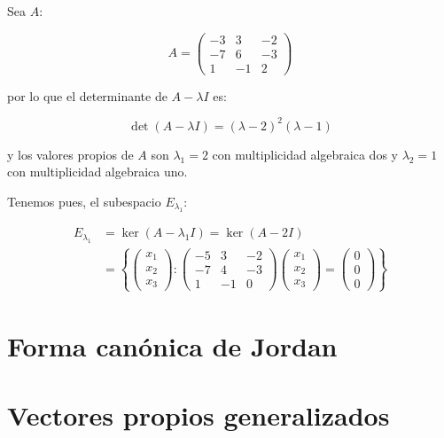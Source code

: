 		\begin{ejemplo}
			Sea $A$:

			\begin{equation*}
				A =
				\begin{pmatrix}
					-3 & 3 & -2 \\
					-7 & 6 & -3 \\
					1 & -1 & 2
				\end{pmatrix}
			\end{equation*}

			por lo que el determinante de $A - \lambda I$ es:

			\begin{equation*}
				\det{(A - \lambda I)} = (\lambda - 2)^2 (\lambda - 1)
			\end{equation*}

			y los valores propios de $A$ son $\lambda_1 = 2$ con multiplicidad algebraica dos y $\lambda_2 = 1$ con multiplicidad algebraica uno.

			Tenemos pues, el subespacio $E_{\lambda_1}$:

			\begin{align*}
				E_{\lambda_1} &= \ker{(A - \lambda_1 I)} = \ker{(A - 2I)} \\
				&= \left\{ \begin{pmatrix} x_1 \\ x_2 \\ x_3 \end{pmatrix} \colon \begin{pmatrix} -5 & 3 & -2 \\ -7 & 4 & -3 \\ 1 & -1 & 0 \end{pmatrix} \begin{pmatrix} x_1 \\ x_2 \\ x_3 \end{pmatrix} = \begin{pmatrix} 0 \\ 0 \\ 0 \end{pmatrix} \right\}
			\end{align*}
		\end{ejemplo}

\newpage
\section{Forma canónica de Jordan}

\newpage
\section{Vectores propios generalizados}